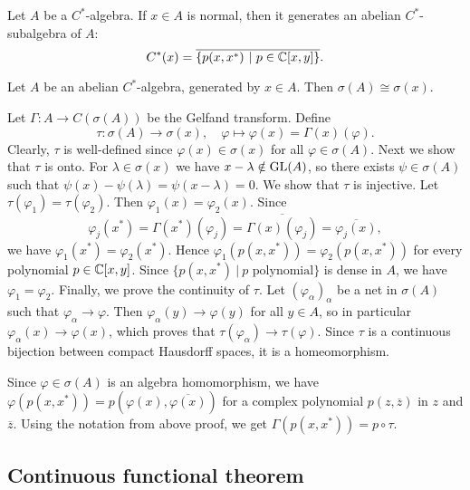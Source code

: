 \begin{remark}
  Let $A$ be a $C^*$-algebra. If $x \in A$ is normal, then it generates an abelian $C^*$-subalgebra of $A$:
  $$C^* (x) = \overline{\{p(x, x^*)\ |\ p \in \mathbb {C}[x, y]\}}.$$
\end{remark}

\begin{corollary}
  Let $A$ be an abelian $C^*$-algebra, generated by $x \in A$. Then $\sigma (A) \cong \sigma(x)$.
\end{corollary}

\begin{myproof}
  Let $\Gamma: A \to C(\sigma(A))$ be the Gelfand transform.
  Define $$\tau: \sigma(A) \to \sigma(x),\quad \varphi \mapsto \varphi(x) = \Gamma(x) (\varphi).$$
  Clearly, $\tau$ is well-defined since $\varphi(x) \in \sigma (x)$ for all $\varphi \in \sigma (A)$.
  Next we show that $\tau$ is onto. For $\lambda \in \sigma(x)$ we have
  $x - \lambda \notin \operatorname{GL}(A)$, so there exists $\psi \in \sigma(A)$ such that $\psi(x) - \psi (\lambda) = \psi (x - \lambda) = 0$.
  We show that $\tau$ is injective. Let $\tau (\varphi_1) = \tau(\varphi_2)$.
  Then $\varphi_1(x) = \varphi_2(x)$. Since 
  $$\varphi_j (x^*) = \Gamma(x^*) (\varphi_j) = \overline{\Gamma(x)(\varphi_j)} = \overline{\varphi_j(x)},$$
  we have $\varphi_1(x^*) = \varphi_2(x^*)$. Hence $\varphi_1 (p(x, x^*)) = \varphi_2(p(x, x^*))$ for every polynomial $p \in \mathbb {C} [x, y]$.
  Since $\{p(x, x^*)\ |\ \textrm{$p$ polynomial}\}$ is dense in $A$, we have $\varphi_1 = \varphi_2$.
  Finally, we prove the continuity of $\tau$. Let $(\varphi_\alpha)_{\alpha}$ be a net in $\sigma(A)$ such that $\varphi_\alpha \to \varphi$.
  Then $\varphi_\alpha(y) \to \varphi(y)$ for all $y \in A$, so in particular $\varphi_\alpha (x) \to \varphi(x)$,
  which proves that $\tau (\varphi_\alpha) \to \tau(\varphi)$. Since $\tau$ is a continuous bijection between compact
  Hausdorff spaces, it is a homeomorphism.
\end{myproof}

\begin{remark}
  Since $\varphi \in \sigma(A)$ is an algebra homomorphism, we have $\varphi(p(x, x^*)) = p(\varphi(x), \overline{\varphi(x)})$
  for a complex polynomial $p(z, \overline{z})$ in $z$ and $\overline{z}$. Using the notation from above proof, 
  we get $\Gamma (p(x, x^*)) = p \circ \tau$.
\end{remark}

\subsection{Continuous functional theorem}

